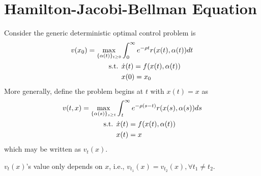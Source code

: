 \documentclass[11pt]{elegantbook}
\begin{document}
\section{Hamilton-Jacobi-Bellman Equation}
Consider the generic deterministic optimal control problem is
\begin{equation}
    \begin{aligned}
        v(x_0)=\max_{\{\alpha(t)\}_{t\geq 0}}&\int_0^\infty e^{-\rho t}r(x(t),\alpha(t))dt\\
        \textnormal{s.t. }&\dot{x}(t)=f(x(t),\alpha(t))\\
        &x(0)=x_0
    \end{aligned}
    \nonumber
\end{equation}
More generally, define the problem begins at $t$ with $x(t)=x$ as
\begin{equation}
    \begin{aligned}
        v(t,x)=\max_{\{\alpha(s)\}_{s\geq t}}&\int_t^\infty e^{-\rho(s-t)}r(x(s),\alpha(s))ds\\
        \textnormal{s.t. }&\dot{x}(t)=f(x(t),\alpha(t))\\
        &x(t)=x
    \end{aligned}
    \nonumber
\end{equation}
which may be written as $v_t(x)$.
\begin{note}
    $v_t(x)$'s value only depends on $x$, i.e., $v_{t_1}(x)=v_{t_2}(x),\forall t_1\neq t_2$.
\end{note}
\end{document}
